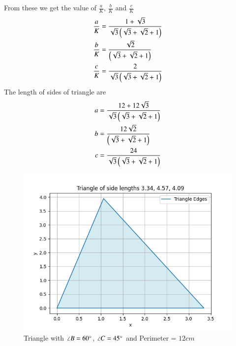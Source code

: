 \documentclass[journal]{IEEEtran}
\begin{document}
From these we get the value of $\frac{a}{K}$, $\frac{b}{K}$ and $\frac{c}{K}$
\begin{align}
\frac{a}{K}&=\frac{1+\sqrt{3}}{\sqrt{3}\left(\sqrt{3}+\sqrt{2}+1\right)}\\
\frac{b}{K}&=\frac{\sqrt{2}}{\left(\sqrt{3}+\sqrt{2}+1\right)}\\
\frac{c}{K}&=\frac{2}{\sqrt{3}\left(\sqrt{3}+\sqrt{2}+1\right)}
\end{align}
The length of sides of triangle are
\begin{align}
a&=\frac{12+12\sqrt{3}}{\sqrt{3}\left(\sqrt{3}+\sqrt{2}+1\right)}\\
b&=\frac{12\sqrt{2}}{\left(\sqrt{3}+\sqrt{2}+1\right)}\\
c&=\frac{24}{\sqrt{3}\left(\sqrt{3}+\sqrt{2}+1\right)}
\end{align}
\begin{figure}[h!]
   \centering
   \includegraphics[width=0.7\linewidth]{figs/fig.png}
   \caption{Triangle with $\angle B=60\degree$, $\angle C=45\degree$ and Perimeter = $12cm$}
\end{figure}
\end{document}
